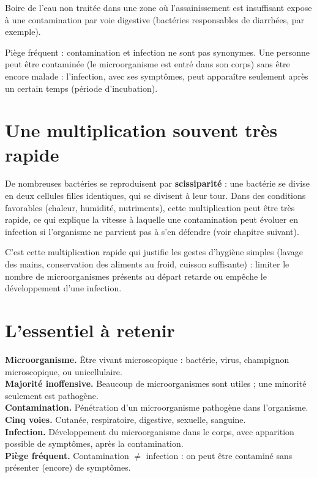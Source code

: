 \begin{exemple}
Boire de l'eau non traitée dans une zone où l'assainissement est insuffisant expose à
une contamination par voie digestive (bactéries responsables de diarrhées, par
exemple).
\end{exemple}

\begin{remarque}
Piège fréquent : contamination et infection ne sont pas synonymes. Une personne peut
être contaminée (le microorganisme est entré dans son corps) sans être encore malade :
l'infection, avec ses symptômes, peut apparaître seulement après un certain temps
(période d'incubation).
\end{remarque}

\section{Une multiplication souvent très rapide}

\begin{propriete}
De nombreuses bactéries se reproduisent par \textbf{scissiparité} : une bactérie se
divise en deux cellules filles identiques, qui se divisent à leur tour. Dans des
conditions favorables (chaleur, humidité, nutriments), cette multiplication peut être
très rapide, ce qui explique la vitesse à laquelle une contamination peut évoluer en
infection si l'organisme ne parvient pas à s'en défendre (voir chapitre suivant).
\end{propriete}

\begin{remarque}
C'est cette multiplication rapide qui justifie les gestes d'hygiène simples (lavage des
mains, conservation des aliments au froid, cuisson suffisante) : limiter le nombre de
microorganismes présents au départ retarde ou empêche le développement d'une
infection.
\end{remarque}

\section{L'essentiel à retenir}

\begin{synthese}
\textbf{Microorganisme.} Être vivant microscopique : bactérie, virus, champignon
microscopique, ou unicellulaire.\\[4pt]
\textbf{Majorité inoffensive.} Beaucoup de microorganismes sont utiles ; une minorité
seulement est pathogène.\\[4pt]
\textbf{Contamination.} Pénétration d'un microorganisme pathogène dans
l'organisme.\\[4pt]
\textbf{Cinq voies.} Cutanée, respiratoire, digestive, sexuelle, sanguine.\\[4pt]
\textbf{Infection.} Développement du microorganisme dans le corps, avec apparition
possible de symptômes, après la contamination.\\[4pt]
\textbf{Piège fréquent.} Contamination $\neq$ infection : on peut être contaminé sans
présenter (encore) de symptômes.
\end{synthese}

